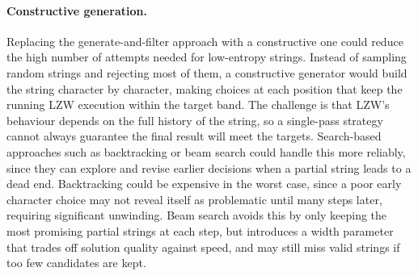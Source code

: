 \documentclass{l4proj}
\begin{document}
\paragraph{Constructive generation.}
Replacing the generate-and-filter approach with a constructive one could reduce the high number of attempts needed for low-entropy strings. Instead of sampling random strings and rejecting most of them, a constructive generator would build the string character by character, making choices at each position that keep the running LZW execution within the target band. The challenge is that LZW's behaviour depends on the full history of the string, so a single-pass strategy cannot always guarantee the final result will meet the targets. Search-based approaches such as backtracking or beam search could handle this more reliably, since they can explore and revise earlier decisions when a partial string leads to a dead end. Backtracking could be expensive in the worst case, since a poor early character choice may not reveal itself as problematic until many steps later, requiring significant unwinding. Beam search avoids this by only keeping the most promising partial strings at each step, but introduces a width parameter that trades off solution quality against speed, and may still miss valid strings if too few candidates are kept.

%
% 
\end{document}
